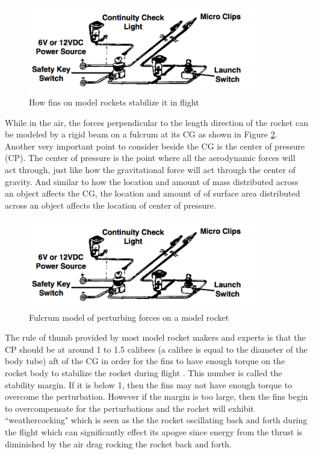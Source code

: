 \documentclass{workreport}
\begin{document}
\begin{body}
	\begin{figure}[!ht]
		\centering
		\includegraphics[width=10cm]{./images/fin_stable.png}
		\caption{How fins on model rockets stabilize it in flight}
		\label{fig:fin_stable}
	\end{figure}

	While in the air, the forces perpendicular to the length direction of the rocket can be modeled by a rigid beam on a fulcrum at its CG as shown in Figure \ref{fig:fulcrum}. Another very important point to consider beside the CG is the center of pressure (CP). The center of pressure is the point where all the aerodynamic forces will act through, just like how the gravitational force will act through the center of gravity. And similar to how the location and amount of mass distributed across an object affects the CG, the location and amount of of surface area distributed across an object affects the location of center of pressure.

	\begin{figure}[!ht]
		\centering
		\includegraphics[width=10cm]{./images/fulcrum.png}
		\caption{Fulcrum model of perturbing forces on a model rocket}
		\label{fig:fulcrum}
	\end{figure}

	The rule of thumb provided by most model rocket makers and experts is that the CP should be at around 1 to 1.5 calibres (a calibre is equal to the diameter of the body tube) aft of the CG in order for the fins to have enough torque on the rocket body to stabilize the rocket during flight\cite{estes_rocket_tech} \cite{centuri_manual}. This number is called the stability margin. If it is below 1, then the fins may not have enough torque to overcome the perturbation. However if the margin is too large, then the fins begin to overcompensate for the perturbations and the rocket will exhibit ``weathercocking" which is seen as the the rocket oscillating back and forth during the flight which can significantly effect its apogee since energy from the thrust is diminished by the air drag rocking the rocket back and forth.


\end{body}
\end{document}

